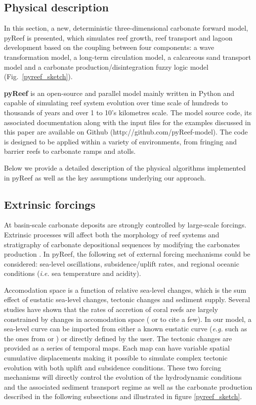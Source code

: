 \documentclass[default,jgrga]{agutex2015}
\begin{document}
\begin{article}
\section{Physical description}

In this section, a new, deterministic three-dimensional carbonate forward model, pyReef is presented, which simulates reef growth, reef transport and lagoon development based on the coupling between four components: a wave transformation model, a long-term circulation model, a calcareous sand transport model and a carbonate production/disintegration fuzzy logic model (Fig.~\ref{pyreef_sketch}).

\noindent \textbf{pyReef} is an open-source and parallel model mainly written in Python and capable of simulating reef system evolution over time scale of hundreds to thousands of years and over 1 to 10's kilometres scale. The model source code, its associated documentation along with the input files for the examples discussed in this paper are available on Github (http://github.com/pyReef-model). The code is designed to be applied within a variety of environments, from fringing and barrier reefs to carbonate ramps and atolls.

\noindent Below we provide a detailed description of the physical algorithms implemented in pyReef as well as the key assumptions underlying our approach.

\subsection{Extrinsic forcings}

At basin-scale carbonate deposits are strongly controlled by large-scale forcings. Extrinsic processes will affect both the morphology of reef systems and stratigraphy of carbonate depositional sequences by modifying the carbonates production \citep{Hill06}. In pyReef, the following set of external forcing mechanisms could be considered: sea-level oscillations, subsidence/uplift rates, and regional oceanic conditions (\textit{i.e.} sea temperature and acidity).

\noindent Accomodation space is a function of relative sea-level changes, which is the sum effect of eustatic sea-level changes, tectonic changes and sediment supply. Several studies have shown that the rates of accretion of coral reefs are largely constrained by changes in accomodation space (\citet{VanWoesik15} or \citet{Roff15} to cite a few). In our model, a sea-level curve can be imported from either a known eustatic curve (\textit{e.g.} such as the ones from \citet{Haq87} or \citet{Miller05}) or directly defined by the user. The tectonic changes are provided as a series of temporal maps. Each map can have variable spatial cumulative displacements making it possible to simulate complex tectonic evolution with both uplift and subsidence conditions. These two forcing mechanisms will directly control the evolution of the hydrodynamic conditions and the associated sediment transport regime as well as the carbonate production described in the following subsections and illustrated in figure \ref{pyreef_sketch}.


\end{article}
\end{document}
